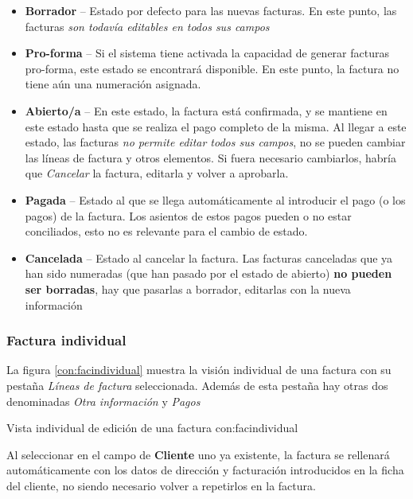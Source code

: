 \begin{itemize}
  \item \textbf{Borrador} -- Estado por defecto para las nuevas facturas. En este punto, las facturas \emph{son todavía editables en todos sus
                             campos}
  \item \textbf{Pro-forma} -- Si el sistema tiene activada la capacidad de generar facturas pro-forma, este estado se encontrará disponible. En
                             este punto, la factura no tiene aún una numeración asignada.
  \item \textbf{Abierto/a} -- En este estado, la factura está confirmada, y se mantiene en este estado hasta que se realiza el pago completo
                             de la misma. Al llegar a este estado, las facturas \emph{no permite editar todos sus campos}, no se pueden cambiar
                             las líneas de factura y otros elementos. Si fuera necesario cambiarlos, habría que \emph{Cancelar} la factura, editarla
                             y volver a aprobarla.
  \item \textbf{Pagada} -- Estado al que se llega automáticamente al introducir el pago (o los pagos) de la factura. Los asientos de estos pagos pueden
                           o no estar conciliados, esto no es relevante para el cambio de estado.
  \item \textbf{Cancelada} -- Estado al cancelar la factura. Las facturas canceladas que ya han sido numeradas (que han pasado por el estado de
                           abierto) \textbf{no pueden ser borradas}, hay que pasarlas a borrador, editarlas con la nueva información
\end{itemize}


\subsubsection{Factura individual}

La figura \ref{con:facindividual} muestra la visión individual de una factura con su pestaña \emph{Líneas de factura} seleccionada. Además de esta pestaña hay otras dos denominadas \emph{Otra información} y \emph{Pagos}

{Vista individual de edición de una factura}
{con:facindividual}

Al seleccionar en el campo de \textbf{Cliente} uno ya existente, la factura se rellenará automáticamente con los datos de dirección y facturación introducidos en la ficha del cliente, no siendo necesario volver a repetirlos en la factura.

